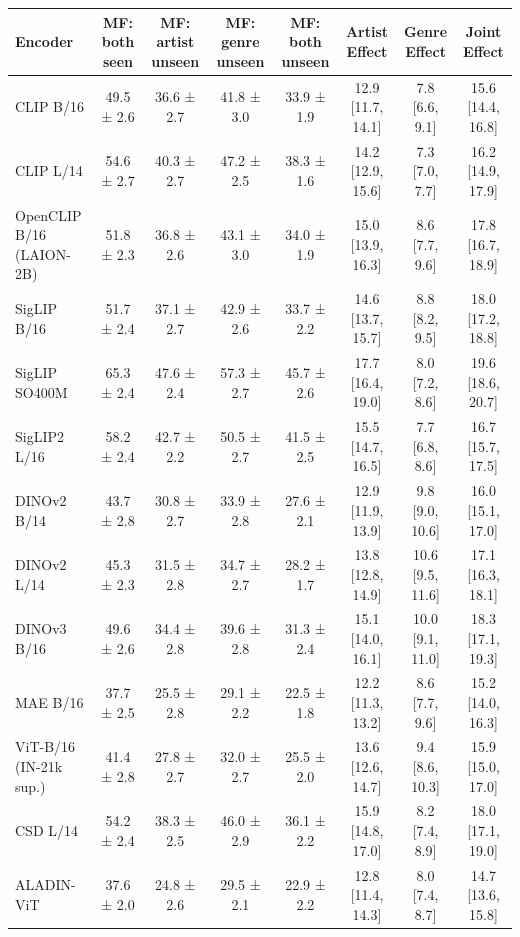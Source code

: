 \begin{tabular}{lccccccc}
\toprule
Encoder & MF: both seen & MF: artist unseen & MF: genre unseen & MF: both unseen & Artist Effect & Genre Effect & Joint Effect \\
\midrule
CLIP B/16 & 49.5 ± 2.6 & 36.6 ± 2.7 & 41.8 ± 3.0 & 33.9 ± 1.9 & 12.9 [11.7, 14.1] & 7.8 [6.6, 9.1] & 15.6 [14.4, 16.8] \\
CLIP L/14 & 54.6 ± 2.7 & 40.3 ± 2.7 & 47.2 ± 2.5 & 38.3 ± 1.6 & 14.2 [12.9, 15.6] & 7.3 [7.0, 7.7] & 16.2 [14.9, 17.9] \\
OpenCLIP B/16 (LAION-2B) & 51.8 ± 2.3 & 36.8 ± 2.6 & 43.1 ± 3.0 & 34.0 ± 1.9 & 15.0 [13.9, 16.3] & 8.6 [7.7, 9.6] & 17.8 [16.7, 18.9] \\
SigLIP B/16 & 51.7 ± 2.4 & 37.1 ± 2.7 & 42.9 ± 2.6 & 33.7 ± 2.2 & 14.6 [13.7, 15.7] & 8.8 [8.2, 9.5] & 18.0 [17.2, 18.8] \\
SigLIP SO400M & 65.3 ± 2.4 & 47.6 ± 2.4 & 57.3 ± 2.7 & 45.7 ± 2.6 & 17.7 [16.4, 19.0] & 8.0 [7.2, 8.6] & 19.6 [18.6, 20.7] \\
SigLIP2 L/16 & 58.2 ± 2.4 & 42.7 ± 2.2 & 50.5 ± 2.7 & 41.5 ± 2.5 & 15.5 [14.7, 16.5] & 7.7 [6.8, 8.6] & 16.7 [15.7, 17.5] \\
DINOv2 B/14 & 43.7 ± 2.8 & 30.8 ± 2.7 & 33.9 ± 2.8 & 27.6 ± 2.1 & 12.9 [11.9, 13.9] & 9.8 [9.0, 10.6] & 16.0 [15.1, 17.0] \\
DINOv2 L/14 & 45.3 ± 2.3 & 31.5 ± 2.8 & 34.7 ± 2.7 & 28.2 ± 1.7 & 13.8 [12.8, 14.9] & 10.6 [9.5, 11.6] & 17.1 [16.3, 18.1] \\
DINOv3 B/16 & 49.6 ± 2.6 & 34.4 ± 2.8 & 39.6 ± 2.8 & 31.3 ± 2.4 & 15.1 [14.0, 16.1] & 10.0 [9.1, 11.0] & 18.3 [17.1, 19.3] \\
MAE B/16 & 37.7 ± 2.5 & 25.5 ± 2.8 & 29.1 ± 2.2 & 22.5 ± 1.8 & 12.2 [11.3, 13.2] & 8.6 [7.7, 9.6] & 15.2 [14.0, 16.3] \\
ViT-B/16 (IN-21k sup.) & 41.4 ± 2.8 & 27.8 ± 2.7 & 32.0 ± 2.7 & 25.5 ± 2.0 & 13.6 [12.6, 14.7] & 9.4 [8.6, 10.3] & 15.9 [15.0, 17.0] \\
CSD L/14 & 54.2 ± 2.4 & 38.3 ± 2.5 & 46.0 ± 2.9 & 36.1 ± 2.2 & 15.9 [14.8, 17.0] & 8.2 [7.4, 8.9] & 18.0 [17.1, 19.0] \\
ALADIN-ViT & 37.6 ± 2.0 & 24.8 ± 2.6 & 29.5 ± 2.1 & 22.9 ± 2.2 & 12.8 [11.4, 14.3] & 8.0 [7.4, 8.7] & 14.7 [13.6, 15.8] \\
\bottomrule
\end{tabular}
